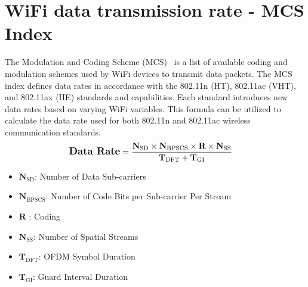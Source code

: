 \section{WiFi data transmission rate - MCS Index}
\label{sec:intro:WiFi-MCS}

The Modulation and Coding Scheme (MCS)~\cite{MCS-Index} is a list of available coding and modulation schemes used by WiFi devices to transmit data packets. The MCS index defines data rates in accordance with the 802.11n (HT), 802.11ac (VHT), and 802.11ax (HE) standards and capabilities. Each standard introduces new data rates based on varying WiFi variables. This formula can be utilized to calculate the data rate used for both 802.11n and 802.11ac wireless communication standards.
\vspace{2cm}
\begin{align*}
\textbf{\large Data Rate} &= \frac{\textbf{N}_{\text{SD}} \times \textbf{N}_{\text{BPSCS}} \times \textbf{R} \times \textbf{N}_{\text{SS}}}{\textbf{T}_{\text{DFT}} + \textbf{T}_{\text{GI}}}
\end{align*}
\begin{itemize}
    \item $\textbf{N}_{\text{SD}}$: Number of Data Sub-carriers
    \item $\textbf{N}_{\text{BPSCS}}$: Number of Code Bits per Sub-carrier Per Stream
    \item $\textbf{R}$ : Coding
    \item $\textbf{N}_{\text{SS}}$: Number of Spatial Streams
    \item $\textbf{T}_{\text{DFT}}$: OFDM Symbol Duration
    \item $\textbf{T}_{\text{GI}}$: Guard Interval Duration
\end{itemize}
\vspace{2cm}
\clearpage
